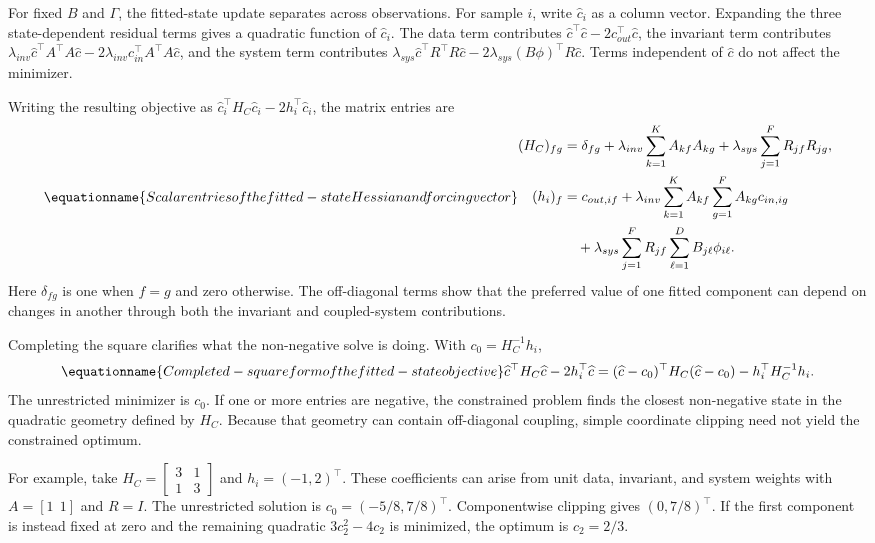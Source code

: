 For fixed \(B\) and \(\Gamma\), the fitted-state update separates across observations. For sample \(i\), write \(\widehat c_i\) as a column vector. Expanding the three state-dependent residual terms gives a quadratic function of \(\widehat c_i\). The data term contributes \(\widehat c^\top\widehat c-2c_{out}^\top\widehat c\), the invariant term contributes \(\lambda_{inv}\widehat c^\top A^\top A\widehat c-2\lambda_{inv}c_{in}^\top A^\top A\widehat c\), and the system term contributes \(\lambda_{sys}\widehat c^\top R^\top R\widehat c-2\lambda_{sys}(B\phi)^\top R\widehat c\). Terms independent of \(\widehat c\) do not affect the minimizer.

Writing the resulting objective as \(\widehat c_i^\top H_C\widehat c_i-2h_i^\top\widehat c_i\), the matrix entries are
\begin{equation}
\equationname{Scalar entries of the fitted-state Hessian and forcing vector}
\label{eq:icsor_state_scalar_coefficients}
\begin{aligned}
(H_C)_{fg}&=\delta_{fg}+\lambda_{inv}\sum_{k=1}^{K}A_{kf}A_{kg}
+\lambda_{sys}\sum_{j=1}^{F}R_{jf}R_{jg},\\
(h_i)_f&=c_{out,if}
+\lambda_{inv}\sum_{k=1}^{K}A_{kf}\sum_{g=1}^{F}A_{kg}c_{in,ig}\\
&\quad+\lambda_{sys}\sum_{j=1}^{F}R_{jf}\sum_{\ell=1}^{D}B_{j\ell}\phi_{i\ell}.
\end{aligned}
\end{equation}
Here \(\delta_{fg}\) is one when \(f=g\) and zero otherwise. The off-diagonal terms show that the preferred value of one fitted component can depend on changes in another through both the invariant and coupled-system contributions.

Completing the square clarifies what the non-negative solve is doing. With \(c_0=H_C^{-1}h_i\),
\begin{equation}
\equationname{Completed-square form of the fitted-state objective}
\label{eq:icsor_state_completed_square}
\widehat c^\top H_C\widehat c-2h_i^\top\widehat c
=(\widehat c-c_0)^\top H_C(\widehat c-c_0)
-h_i^\top H_C^{-1}h_i.
\end{equation}
The unrestricted minimizer is \(c_0\). If one or more entries are negative, the constrained problem finds the closest non-negative state in the quadratic geometry defined by \(H_C\). Because that geometry can contain off-diagonal coupling, simple coordinate clipping need not yield the constrained optimum.

For example, take
\(H_C=\begin{bmatrix}3&1\\1&3\end{bmatrix}\) and \(h_i=(-1,2)^\top\). These coefficients can arise from unit data, invariant, and system weights with \(A=[1\ \ 1]\) and \(R=I\). The unrestricted solution is \(c_0=(-5/8,7/8)^\top\). Componentwise clipping gives \((0,7/8)^\top\). If the first component is instead fixed at zero and the remaining quadratic \(3c_2^2-4c_2\) is minimized, the optimum is \(c_2=2/3\).

